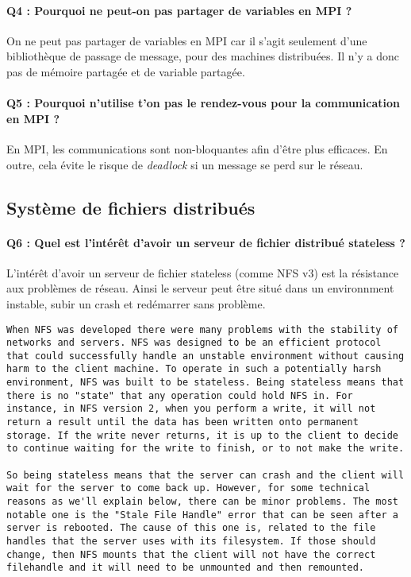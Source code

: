 \documentclass[a4paper]{article}
\begin{document}
\paragraph{Q4 : Pourquoi ne peut-on pas partager de variables en MPI ?}
On ne peut pas partager de variables en MPI car il s'agit seulement d'une bibliothèque de passage de message, pour des machines distribuées. Il n'y a donc pas de mémoire partagée et de variable partagée.

\paragraph{Q5 : Pourquoi n'utilise t'on pas le rendez-vous pour la communication en MPI ?}
En MPI, les communications sont non-bloquantes afin d'être plus efficaces. En outre, cela évite le risque de \textit{deadlock} si un message se perd sur le réseau.

\subsection{Système de fichiers distribués}

\paragraph{Q6 : Quel est l'intérêt d'avoir un serveur de fichier distribué stateless ?}
L'intérêt d'avoir un serveur de fichier stateless (comme NFS v3) est la résistance aux problèmes de réseau. Ainsi le serveur peut être situé dans un environnment instable, subir un crash et redémarrer sans problème.

\begin{lstlisting}[breaklines=true, basicstyle=\footnotesize, frame=single]
 When NFS was developed there were many problems with the stability of networks and servers. NFS was designed to be an efficient protocol that could successfully handle an unstable environment without causing harm to the client machine. To operate in such a potentially harsh environment, NFS was built to be stateless. Being stateless means that there is no "state" that any operation could hold NFS in. For instance, in NFS version 2, when you perform a write, it will not return a result until the data has been written onto permanent storage. If the write never returns, it is up to the client to decide to continue waiting for the write to finish, or to not make the write.

So being stateless means that the server can crash and the client will wait for the server to come back up. However, for some technical reasons as we'll explain below, there can be minor problems. The most notable one is the "Stale File Handle" error that can be seen after a server is rebooted. The cause of this one is, related to the file handles that the server uses with its filesystem. If those should change, then NFS mounts that the client will not have the correct filehandle and it will need to be unmounted and then remounted.
\end{lstlisting}
\end{document}
